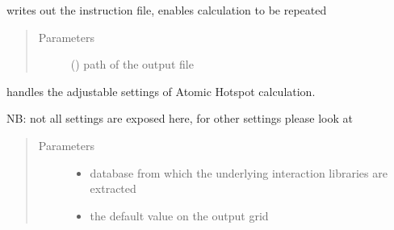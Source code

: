 \documentclass[letterpaper,10pt,english]{sphinxmanual}
\begin{document}
\begin{fulllineitems}
\begin{fulllineitems}
\begin{fulllineitems}
\label{\detokenize{atomic_hotspot_calculation_api:hotspots.atomic_hotspot_calculation.AtomicHotspot.InstructionFile.write}}
writes out the instruction file, enables calculation to be repeated
\begin{quote}\begin{description}
\item[{Parameters}] \leavevmode
{} () \textendash{} path of the output file

\end{description}\end{quote}

\end{fulllineitems}


\end{fulllineitems}


\begin{fulllineitems}
\label{\detokenize{atomic_hotspot_calculation_api:hotspots.atomic_hotspot_calculation.AtomicHotspot.Settings}}
handles the adjustable settings of Atomic Hotspot calculation.

NB: not all settings are exposed here, for other settings please look at
\begin{quote}\begin{description}
\item[{Parameters}] \leavevmode\begin{itemize}
\item {} 
 \textendash{} database from which the underlying interaction libraries are extracted

\item {} 
 \textendash{} the default value on the output grid


\end{itemize}
\end{description}
\end{quote}
\end{fulllineitems}
\end{fulllineitems}
\end{document}
